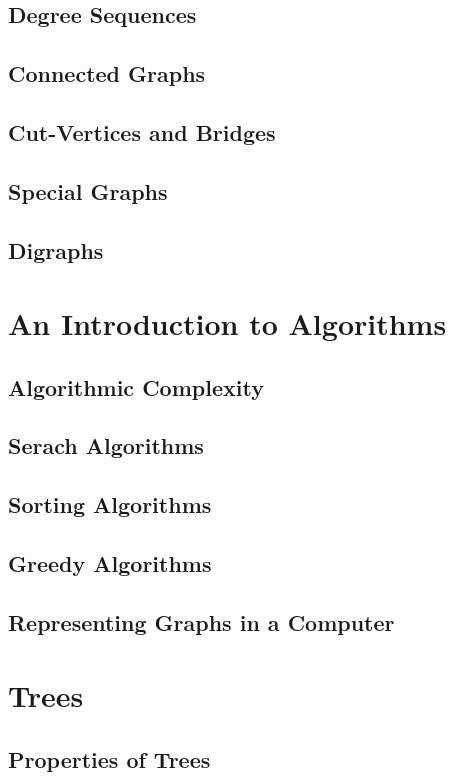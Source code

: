 \section{Degree Sequences}
\section{Connected Graphs}
\section{Cut-Vertices and Bridges}
\section{Special Graphs}
\section{Digraphs}

\chapter{An Introduction to Algorithms}
\section{Algorithmic Complexity}
\section{Serach Algorithms}
\section{Sorting Algorithms}
\setcounter{section}{4}
\section{Greedy Algorithms}
\section{Representing Graphs in a Computer}

\chapter{Trees}
\section{Properties of Trees}
